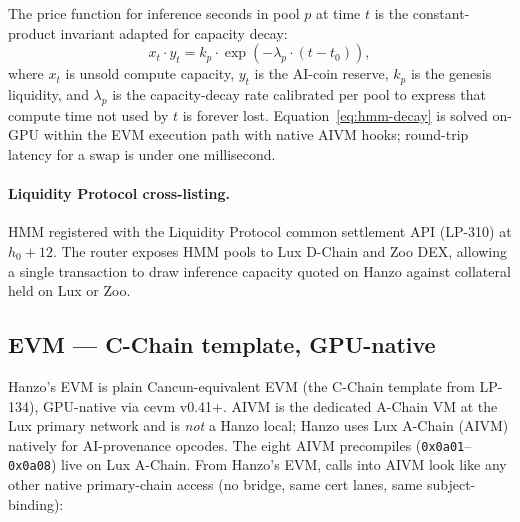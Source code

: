 \documentclass[11pt,letterpaper]{article}
\begin{document}
The price function for inference seconds in pool $p$ at time $t$ is the
constant-product invariant adapted for capacity decay:
\begin{equation}
x_t \cdot y_t = k_p \cdot \exp\!\left(-\lambda_p \cdot (t - t_0)\right),
\label{eq:hmm-decay}
\end{equation}
where $x_t$ is unsold compute capacity, $y_t$ is the AI-coin
reserve, $k_p$ is the genesis liquidity, and $\lambda_p$ is the
capacity-decay rate calibrated per pool to express that compute time
not used by $t$ is forever lost. Equation~\ref{eq:hmm-decay} is solved
on-GPU within the EVM execution path with native AIVM hooks; round-trip latency for a swap is
under one millisecond.

\paragraph{Liquidity Protocol cross-listing.} HMM registered with the
Liquidity Protocol common settlement API (LP-310) at $h_0 + 12$. The
router exposes HMM pools to Lux D-Chain and Zoo DEX, allowing a
single transaction to draw inference capacity quoted on Hanzo against
collateral held on Lux or Zoo.

\subsection{EVM --- C-Chain template, GPU-native}

Hanzo's EVM is plain Cancun-equivalent EVM (the C-Chain template
from LP-134), GPU-native via cevm v0.41+. AIVM is the dedicated
A-Chain VM at the Lux primary network and is \emph{not} a Hanzo
local; Hanzo uses Lux A-Chain (AIVM) natively for AI-provenance
opcodes. The eight AIVM precompiles (\texttt{0x0a01}--\texttt{0x0a08})
live on Lux A-Chain. From Hanzo's EVM, calls into AIVM look like any
other native primary-chain access (no bridge, same cert lanes, same
subject-binding):
\end{document}
